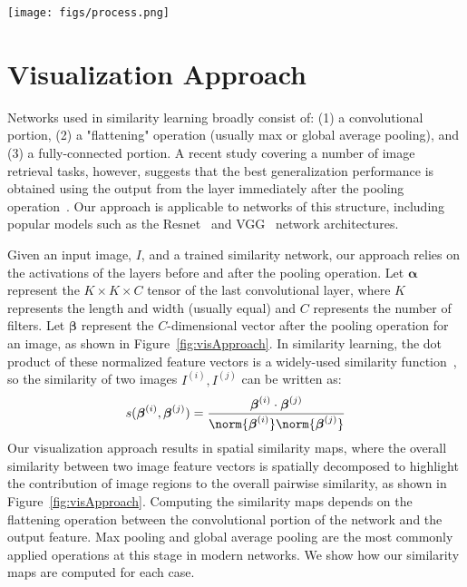 \begin{figure*}
    \centering
    \texttt{[image: figs/process.png]}
    \caption{Our approach considers similarity networks with a final convolutional layer, $\boldsymbol{\alpha}$, followed by a pooling operation which produces output features, $\boldsymbol{\beta}$. Similarity between two images is measured as the dot product of these output features after normalization.  Factoring this value produces visualizations that highlight how much each region of the image contributes to the similarity.}
    \label{fig:visApproach}
\end{figure*}
\section{Visualization Approach}
\label{sec:model}

Networks used in similarity learning broadly consist of: (1) a convolutional portion, (2) a "flattening" operation (usually max or global average pooling), and (3) a fully-connected portion. A recent study covering a number of image retrieval tasks, however, suggests that the best generalization performance is obtained using the output from the layer immediately after the pooling operation~\cite{vo2018generalization}. Our approach is applicable to networks of this structure, including popular models such as the Resnet~\cite{resnet} and VGG~\cite{vggfaces} network architectures.  

Given an input image, $I$, and a trained similarity network, our approach relies on the activations of the layers before and after the pooling operation. Let $\boldsymbol{\alpha}$ represent the $K \times K \times C$ tensor of the last convolutional layer, where $K$ represents the length and width (usually equal) and $C$ represents the number of filters. Let $\boldsymbol{\beta}$ represent the $C$-dimensional vector after the pooling operation for an image, as shown in Figure~\ref{fig:visApproach}. In similarity learning, the dot product of these normalized feature vectors is a widely-used similarity function~\cite{bell2015learning,Proxy,schroff2015facenet,sun2014deep,wang2014learning,yi2014deep}, so the similarity of two images $I^{(i)},I^{(j)}$ can be written as:
\begin{equation}
s(\boldsymbol{\beta}^{(i)},\boldsymbol{\beta}^{(j)}) = \frac{\boldsymbol{\beta}^{(i)} \cdot \boldsymbol{\beta}^{(j)}}{\norm{\boldsymbol{\beta}^{(i)}} \norm{\boldsymbol{\beta}^{(j)}}}
\label{eq:cosineSim}
\end{equation}
Our visualization approach results in spatial similarity maps, where the overall similarity between two image feature vectors is spatially decomposed to highlight the contribution of image regions to the overall pairwise similarity, as shown in Figure~\ref{fig:visApproach}. Computing the similarity maps depends on the flattening operation between the convolutional portion of the network and the output feature. Max pooling and global average pooling are the most commonly applied operations at this stage in modern networks. We show how our similarity maps are computed for each case.

